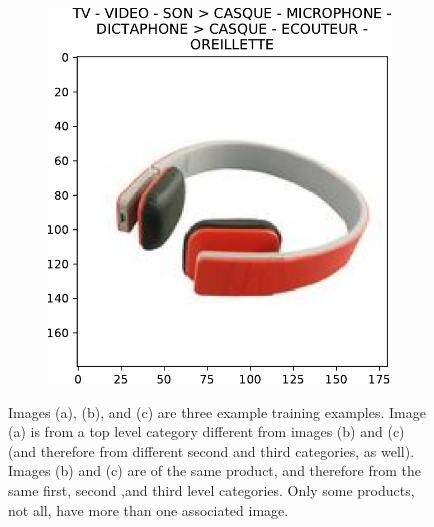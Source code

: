\begin{figure}
\begin{subfigure}[t]{0.33\columnwidth}
        \caption{}
    \end{subfigure}%
    ~ 
    \begin{subfigure}[t]{0.33\columnwidth}
        \centering
        \includegraphics[width=\textwidth]{img/img-12-1}
        \caption{}
    \end{subfigure}
	\caption{
Images (a), (b), and (c) are three example training examples.
Image (a) is from a top level category different from images (b) and (c) (and therefore from different second and third categories, as well).
Images (b) and (c) are of the same product, and therefore from the same first, second ,and third level categories.
Only some products, not all, have more than one associated image.
}
	\label{fig:example-images}
\end{figure}